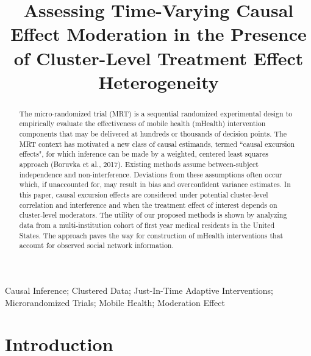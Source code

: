 \documentclass[12pt]{article}
\begin{document}
\title{Assessing Time-Varying Causal Effect Moderation in the Presence of Cluster-Level Treatment Effect Heterogeneity}
\maketitle
\begin{abstract}\noindent

The micro-randomized trial (MRT) is a sequential randomized experimental design to empirically evaluate the effectiveness of mobile health (mHealth) intervention components that may be delivered at hundreds or thousands of decision points. The MRT context has motivated a new class of causal estimands, termed ``causal excursion effects", for which inference can be made by a weighted, centered least squares approach (Boruvka et al., 2017). Existing methods assume between-subject independence and non-interference. Deviations from these assumptions often occur which, if unaccounted for, may result in bias and overconfident variance estimates. In this paper, causal excursion effects are considered under potential cluster-level correlation and interference and when the treatment effect of interest depends on cluster-level moderators. The utility of our proposed methods is shown by analyzing data from a multi-institution cohort of first year medical residents in the United States. The approach paves the way for construction of mHealth interventions that account for observed social network information.
\end{abstract}

 Causal Inference; Clustered Data; Just-In-Time Adaptive Interventions; Microrandomized Trials; Mobile Health; Moderation Effect

\section{Introduction}
\end{document}
